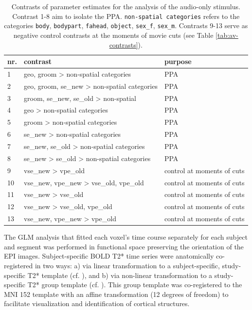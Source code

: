 \documentclass[english]{article}
\begin{document}
\begin{table}[h!]
\caption{Contrasts of parameter estimates for the analysis of the audio-only
    stimulus.
    Contrast 1-8 aim to isolate the PPA.
    \texttt{non-spatial categories} refers to the categories
    \texttt{body}, \texttt{bodypart}, \texttt{fahead},
    \texttt{object}, \texttt{sex\_f}, \texttt{sex\_m}.
    Contrasts 9-13 serve as negative control contrasts at the moments of movie
    cuts (see Table \ref{tab:av-contrasts}).}
\label{tab:ao-contrasts}
\footnotesize
\begin{tabular}{lll}
\toprule
\textbf{nr.} &  \textbf{contrast} & \textbf{purpose} \\
\midrule
1 & geo, groom > non-spatial categories & PPA \tabularnewline
2 & geo, groom, se\_new > non-spatial categories & PPA \tabularnewline
3 & groom, se\_new, se\_old > non-spatial  & PPA \tabularnewline
4 & geo > non-spatial categories & PPA \tabularnewline
5 & groom > non-spatial categories & PPA \tabularnewline
6 & se\_new > non-spatial categories & PPA \tabularnewline
7 & se\_new, se\_old > non-spatial categories & PPA \tabularnewline
8 & se\_new > se\_old > non-spatial categories & PPA \tabularnewline
9 & vse\_new > vpe\_old & control at moments of cuts \tabularnewline
10 & vse\_new, vpe\_new > vse\_old, vpe\_old & control at moments of cuts \tabularnewline
11 & vse\_new > vse\_old & control at moments of cuts \tabularnewline
12 & vse\_new > vse\_old, vpe\_old & control at moments of cuts \tabularnewline
13 & vse\_new, vpe\_new > vpe\_old & control at moments of cuts \tabularnewline
\end{tabular}
\end{table}


The GLM analysis that fitted each voxel's time course separately for each
subject and segment was performed in functional space preserving the orientation
of the EPI images.
Subject-specific BOLD T2* time series were anatomically co-registered in two
ways:
a) via linear transformation to a subject-specific, study-specific T2* template
(cf. \citep{sengupta2016extension}), and
b) via non-linear transformation to a study-specific T2* group template (cf.
\citep{hanke2014audiomovie}).
This group template was co-registered to the MNI 152 template with an affine
transformation (12 degrees of freedom) to facilitate visualization and
identification of cortical structures.
\end{document}
